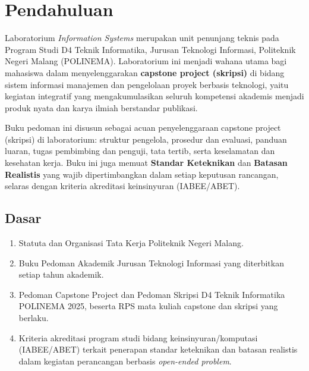 \documentclass[12pt,a4paper]{report}
\begin{document}
\PedomanCover

\clearpage
\tableofcontents

\clearpage
{}

\chapter{Pendahuluan}

Laboratorium \emph{Information Systems} merupakan unit penunjang teknis pada Program Studi D4 Teknik Informatika, Jurusan Teknologi Informasi, Politeknik Negeri Malang (POLINEMA). Laboratorium ini menjadi wahana utama bagi mahasiswa dalam menyelenggarakan \textbf{capstone project (skripsi)} di bidang sistem informasi manajemen dan pengelolaan proyek berbasis teknologi, yaitu kegiatan integratif yang mengakumulasikan seluruh kompetensi akademis menjadi produk nyata dan karya ilmiah berstandar publikasi.

Buku pedoman ini disusun sebagai acuan penyelenggaraan capstone project (skripsi) di laboratorium: struktur pengelola, prosedur dan evaluasi, panduan luaran, tugas pembimbing dan penguji, tata tertib, serta keselamatan dan kesehatan kerja. Buku ini juga memuat \textbf{Standar Keteknikan} dan \textbf{Batasan Realistis} yang wajib dipertimbangkan dalam setiap keputusan rancangan, selaras dengan kriteria akreditasi keinsinyuran (IABEE/ABET).

\section{Dasar}
\begin{enumerate}
\item Statuta dan Organisasi Tata Kerja Politeknik Negeri Malang.
\item Buku Pedoman Akademik Jurusan Teknologi Informasi yang diterbitkan setiap tahun akademik.
\item Pedoman Capstone Project dan Pedoman Skripsi D4 Teknik Informatika POLINEMA 2025, beserta RPS mata kuliah capstone dan skripsi yang berlaku.
\item Kriteria akreditasi program studi bidang keinsinyuran/komputasi (IABEE/ABET) terkait penerapan standar keteknikan dan batasan realistis dalam kegiatan perancangan berbasis \emph{open-ended problem}.
\end{enumerate}
\end{document}
